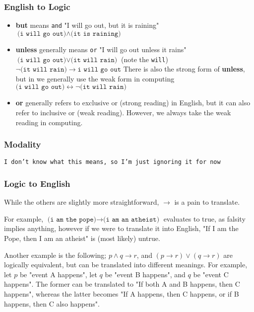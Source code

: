 \documentclass[a4paper, 12pt]{article}
\begin{document}
        \subsubsection*{English to Logic}
        \begin{itemize}
            \item \textbf{but} means \texttt{and}
                \subitem "I will go out, but it is raining" \hfill $\texttt{(i will go out)} \land \texttt{(it is raining)}$
            \item \textbf{unless} generally means \texttt{or}
                \subitem "I will go out unless it rains" \hfill $\texttt{(i will go out)} \lor \texttt{(it will rain)}$ (note the \texttt{will})
                \subitem \hfill $\neg\texttt{(it will rain)} \rightarrow \texttt{i will go out}$
                \subitem There is also the strong form of \textbf{unless}, but in we generally use the weak form in computing
                \subitem \hfill $\texttt{(i will go out)} \leftrightarrow \neg\texttt{(it will rain)}$
            \item \textbf{or} generally refers to exclusive or (strong reading) in English, but it can also refer to inclusive or (weak reading). However, we always take the weak reading in computing.
        \end{itemize}
        \subsubsection*{Modality}
        \texttt{I don't know what this means, so I'm just ignoring it for now}
        \subsubsection*{Logic to English}
        While the others are slightly more straightforward, $\rightarrow$ is a pain to translate.
        \smallskip

        For example, $\texttt{(i am the pope)} \rightarrow \texttt{(i am an atheist)}$ evaluates to true, as falsity implies anything, however if we were to translate it into English, "If I am the Pope, then I am an atheist" is (most likely) untrue.
        \smallskip

        Another example is the following; $p \land q \rightarrow r$, and $(p \rightarrow r) \lor (q \rightarrow r)$ are logically equivalent, but can be translated into different meanings. For example, let $p$ be "event A happens", let $q$ be "event B happens", and $q$ be "event C happens". The former can be translated to "If both A and B happens, then C happens", whereas the latter becomes "If A happens, then C happens, or if B happens, then C also happens".
\end{document}
